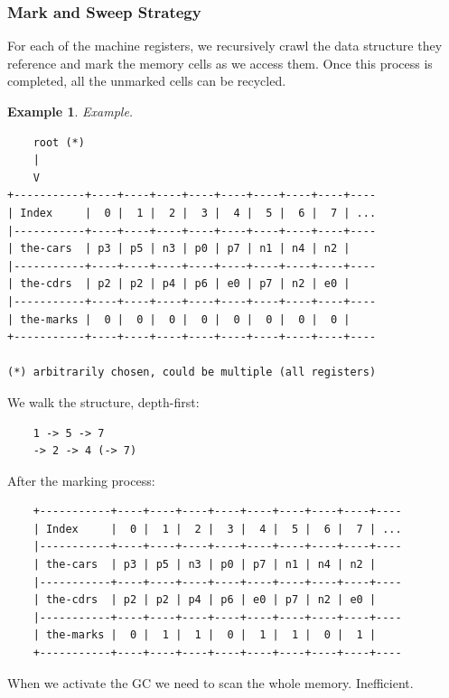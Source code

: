 \documentclass[a4paper,twoside]{article}
\newtheorem{example}[theorem]{Example}
\numberwithin{equation}{section}
\begin{document}
\subsubsection{Mark and Sweep Strategy}
For each of the machine registers, we recursively crawl the data structure they reference and mark
the memory cells as we access them. Once this process is completed, all the unmarked cells can be recycled.
\begin{example}
    Example.
\end{example}
\begin{lstlisting}
    root (*)
    |
    V
+-----------+----+----+----+----+----+----+----+----+----
| Index     |  0 |  1 |  2 |  3 |  4 |  5 |  6 |  7 | ...
|-----------+----+----+----+----+----+----+----+----+----
| the-cars  | p3 | p5 | n3 | p0 | p7 | n1 | n4 | n2 |
|-----------+----+----+----+----+----+----+----+----+----
| the-cdrs  | p2 | p2 | p4 | p6 | e0 | p7 | n2 | e0 |
|-----------+----+----+----+----+----+----+----+----+----
| the-marks |  0 |  0 |  0 |  0 |  0 |  0 |  0 |  0 |
+-----------+----+----+----+----+----+----+----+----+----

(*) arbitrarily chosen, could be multiple (all registers)
\end{lstlisting}
We walk the structure, depth-first:
\begin{lstlisting}
    1 -> 5 -> 7
    -> 2 -> 4 (-> 7)
\end{lstlisting}
After the marking process:
\begin{lstlisting}
    +-----------+----+----+----+----+----+----+----+----+----
    | Index     |  0 |  1 |  2 |  3 |  4 |  5 |  6 |  7 | ...
    |-----------+----+----+----+----+----+----+----+----+----
    | the-cars  | p3 | p5 | n3 | p0 | p7 | n1 | n4 | n2 |
    |-----------+----+----+----+----+----+----+----+----+----
    | the-cdrs  | p2 | p2 | p4 | p6 | e0 | p7 | n2 | e0 |
    |-----------+----+----+----+----+----+----+----+----+----
    | the-marks |  0 |  1 |  1 |  0 |  1 |  1 |  0 |  1 |
    +-----------+----+----+----+----+----+----+----+----+----
\end{lstlisting}
When we activate the GC we need to scan the whole memory. Inefficient.
\end{document}
